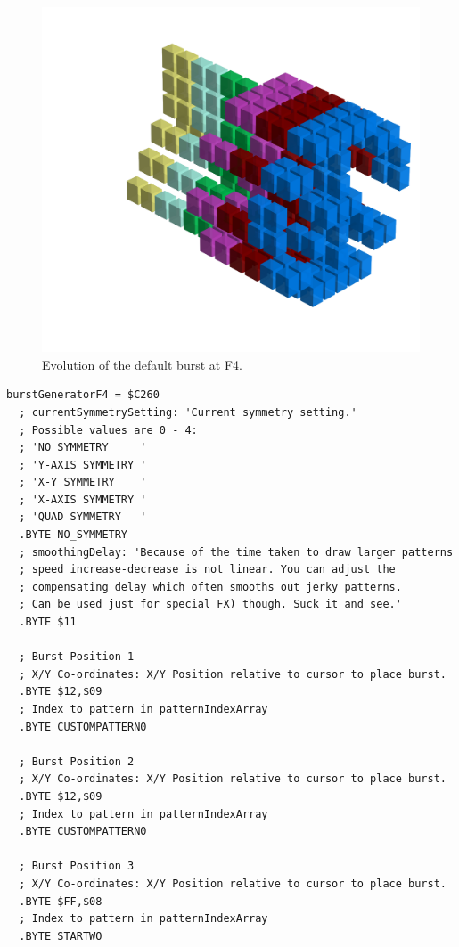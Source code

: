 \clearpage
{}
\begin{figure}[H]
    \centering
    \begin{adjustbox}{width=12cm,center}
      \includegraphics[width=12cm]{src/patterns/bursts/pattern3-45.png}%
    \end{adjustbox}
\caption{Evolution of the default burst at F4.}
\end{figure}
\clearpage

\begin{lstlisting}[caption=Source code for the F4 Burst.]
burstGeneratorF4 = $C260
  ; currentSymmetrySetting: 'Current symmetry setting.'
  ; Possible values are 0 - 4:
  ; 'NO SYMMETRY     '
  ; 'Y-AXIS SYMMETRY '
  ; 'X-Y SYMMETRY    '
  ; 'X-AXIS SYMMETRY '
  ; 'QUAD SYMMETRY   '
  .BYTE NO_SYMMETRY
  ; smoothingDelay: 'Because of the time taken to draw larger patterns
  ; speed increase-decrease is not linear. You can adjust the 
  ; compensating delay which often smooths out jerky patterns. 
  ; Can be used just for special FX) though. Suck it and see.'
  .BYTE $11

  ; Burst Position 1
  ; X/Y Co-ordinates: X/Y Position relative to cursor to place burst.
  .BYTE $12,$09
  ; Index to pattern in patternIndexArray
  .BYTE CUSTOMPATTERN0

  ; Burst Position 2
  ; X/Y Co-ordinates: X/Y Position relative to cursor to place burst.
  .BYTE $12,$09
  ; Index to pattern in patternIndexArray
  .BYTE CUSTOMPATTERN0

  ; Burst Position 3
  ; X/Y Co-ordinates: X/Y Position relative to cursor to place burst.
  .BYTE $FF,$08
  ; Index to pattern in patternIndexArray
  .BYTE STARTWO

\end{lstlisting}

